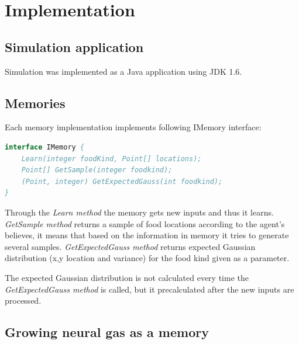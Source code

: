\chapter{Implementation}

\section{Simulation application}

Simulation was implemented as a Java application using JDK 1.6. 

\section{Memories}

Each memory implementation implements following IMemory interface:

\begin{lstlisting}[language=Pascal]
interface IMemory {
	Learn(integer foodKind, Point[] locations);
	Point[] GetSample(integer foodkind);	
	(Point, integer) GetExpectedGauss(int foodkind);
}
\end{lstlisting}  

Through the \emph{Learn method} the memory gets new inputs and thus it learns. \emph{GetSample method} returns a sample of food locations according to the agent's believes, it means that based on the information in memory it tries to generate several samples. \emph{GetExpectedGauss method} returns expected Gaussian distribution (x,y location and variance) for the food kind given as a parameter.    

The expected Gaussian distribution is not calculated every time the \emph{GetExpectedGauss method} is called, but it precalculated after the new inputs are processed.

\section{Growing neural gas as a memory}

